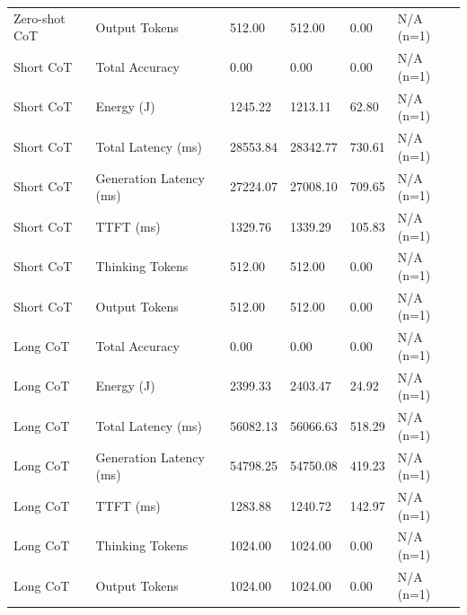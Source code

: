 \begin{table}
\begin{tabular}{llllll}
Zero-shot CoT & Output Tokens & 512.00 & 512.00 & 0.00 & N/A (n=1) \\
Short CoT & Total Accuracy & 0.00 & 0.00 & 0.00 & N/A (n=1) \\
Short CoT & Energy (J) & 1245.22 & 1213.11 & 62.80 & N/A (n=1) \\
Short CoT & Total Latency (ms) & 28553.84 & 28342.77 & 730.61 & N/A (n=1) \\
Short CoT & Generation Latency (ms) & 27224.07 & 27008.10 & 709.65 & N/A (n=1) \\
Short CoT & TTFT (ms) & 1329.76 & 1339.29 & 105.83 & N/A (n=1) \\
Short CoT & Thinking Tokens & 512.00 & 512.00 & 0.00 & N/A (n=1) \\
Short CoT & Output Tokens & 512.00 & 512.00 & 0.00 & N/A (n=1) \\
Long CoT & Total Accuracy & 0.00 & 0.00 & 0.00 & N/A (n=1) \\
Long CoT & Energy (J) & 2399.33 & 2403.47 & 24.92 & N/A (n=1) \\
Long CoT & Total Latency (ms) & 56082.13 & 56066.63 & 518.29 & N/A (n=1) \\
Long CoT & Generation Latency (ms) & 54798.25 & 54750.08 & 419.23 & N/A (n=1) \\
Long CoT & TTFT (ms) & 1283.88 & 1240.72 & 142.97 & N/A (n=1) \\
Long CoT & Thinking Tokens & 1024.00 & 1024.00 & 0.00 & N/A (n=1) \\
Long CoT & Output Tokens & 1024.00 & 1024.00 & 0.00 & N/A (n=1) \\
\bottomrule
\end{tabular}
\end{table}
